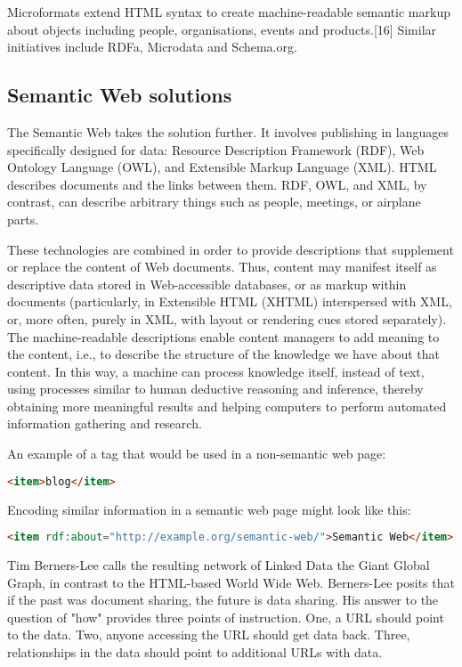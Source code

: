 Microformats extend HTML syntax to create machine-readable semantic markup about objects including people, organisations, events and products.[16] Similar initiatives include RDFa, Microdata and Schema.org.

\subsection{Semantic Web solutions}

The Semantic Web takes the solution further. It involves publishing in languages specifically designed for data: Resource Description Framework (RDF), Web Ontology Language (OWL), and Extensible Markup Language (XML). HTML describes documents and the links between them. RDF, OWL, and XML, by contrast, can describe arbitrary things such as people, meetings, or airplane parts.

These technologies are combined in order to provide descriptions that supplement or replace the content of Web documents. Thus, content may manifest itself as descriptive data stored in Web-accessible databases, or as markup within documents (particularly, in Extensible HTML (XHTML) interspersed with XML, or, more often, purely in XML, with layout or rendering cues stored separately). The machine-readable descriptions enable content managers to add meaning to the content, i.e., to describe the structure of the knowledge we have about that content. In this way, a machine can process knowledge itself, instead of text, using processes similar to human deductive reasoning and inference, thereby obtaining more meaningful results and helping computers to perform automated information gathering and research.

An example of a tag that would be used in a non-semantic web page:

\begin{lstlisting}[language=HTML]
<item>blog</item>
\end{lstlisting}

Encoding similar information in a semantic web page might look like this:

\begin{lstlisting}[language=HTML]
<item rdf:about="http://example.org/semantic-web/">Semantic Web</item>
\end{lstlisting}

Tim Berners-Lee calls the resulting network of Linked Data the Giant Global Graph, in contrast to the HTML-based World Wide Web. Berners-Lee posits that if the past was document sharing, the future is data sharing. His answer to the question of "how" provides three points of instruction. One, a URL should point to the data. Two, anyone accessing the URL should get data back. Three, relationships in the data should point to additional URLs with data.


